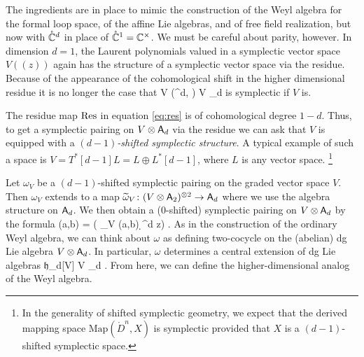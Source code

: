 \documentclass[11pt]{amsart}
\def\lie#1{\ensuremath{\mathfrak{#1}}}
\begin{document}

The ingredients are in place to mimic the construction of the Weyl algebra for the formal loop space, of the affine Lie algebras, and of free field realization, but now with $\mathring{\mathbb C}^d$ in place of $\mathring{\mathbb C}^1 = \mathbb C^\times$.
We must be careful about parity, however. 
In dimension $d = 1$, the Laurent polynomials valued in a symplectic vector space $V((z))$ again has the structure of a symplectic vector space via the residue. 
Because of the appearance of the cohomological shift in the higher dimensional residue it is no longer the case that 
\beqn
V \otimes \RR\Gamma(^d, \cO) \simeq V \otimes \sfA_d
\eeqn
is symplectic if $V$ is.

The residue map ${\rm Res}$ in equation \eqref{eq:res} is of cohomological degree $1-d$. 
Thus, to get a symplectic pairing on $V \otimes \mathsf A_d$ via the residue we can ask that $V$ is equipped with a {\em $(d-1)$-shifted symplectic structure}. 
A typical example of such a space is $V = T^*[d-1] L = L \oplus L^*[d-1]$, where $L$ is any vector space.
\footnote{In the generality of shifted symplectic geometry, we expect that the derived mapping space $\text{Map}(\mathring{D}^n, X)$ is symplectic provided that $X$ is a $(d-1)$-shifted symplectic space.}

Let $\omega_V$ be a $(d-1)$-shifted symplectic pairing on the graded vector space $V$. 
Then $\omega_V$ extends to a map $\widetilde \omega_V \colon (V \otimes \mathsf A_2)^{\otimes 2} \to \mathsf A_d$ where we use the algebra structure on $\mathsf A_d$. 
We then obtain a ($0$-shifted) symplectic pairing on $V \otimes \mathsf A_d$ by the formula
\beqn
\label{eqn:omega}
\omega(a,b) = \Res ( \til \omega_V (a,b) \wedge \d^d z) .
\eeqn
As in the construction of the ordinary Weyl algebra, we can think about $\omega$ as defining two-cocycle on the (abelian) dg Lie algebra $V \otimes \mathsf A_d$.
In particular, $\omega$ determines a central extension of dg Lie algebras
\beqn
\CC \to \lie{h}_d[V] \to V \otimes \sfA_d .
\eeqn
From here, we can define the higher-dimensional analog of the Weyl algebra. 
\end{document}
